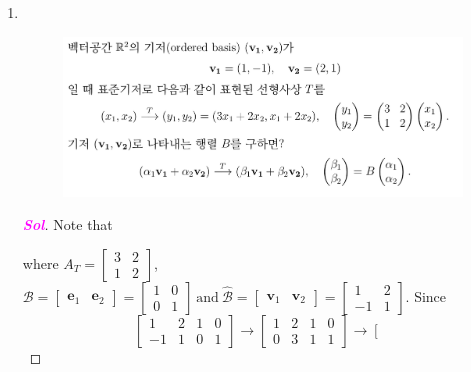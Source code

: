 \documentclass[10pt]{article}
\theoremstyle{definition}
\newcommand{\R}{\mathbb{R}}
\newcommand{\sol}{\textcolor{magenta}{\bf Sol}}
\newcommand{\basis}{\mathscr{B}}
\begin{document}
\begin{enumerate}[\bf 1.]
\newpage
\item \ \begin{figure}[h!]
	\includegraphics[scale=.35]{asgmt1_3.png}
\end{figure}
\begin{proof}[\sol]
	Note that \begin{center}
	\end{center} where $A_T=\begin{bmatrix}
	3&2\\1&2
\end{bmatrix}$, $
	\basis=\begin{bmatrix}
		\textbf{e}_1&\textbf{e}_2
	\end{bmatrix}=\begin{bmatrix}
	1&0\\0&1
\end{bmatrix}\ \text{and}\ \hat{\basis}=\begin{bmatrix}
	\textbf{v}_1&\textbf{v}_2
	\end{bmatrix}=\begin{bmatrix}
	1&2\\-1&1
	\end{bmatrix}.$ Since \[
	\left[\begin{array}{cc|cc}
		1&2 &1&0\\-1&1 &0&1
	\end{array}\right]\rightarrow\left[\begin{array}{cc|cc}
	1&2 &1&0\\0&3 &1&1
\end{array}\right]\rightarrow\left[\begin{array}{cc|cc}

\end{array}\]
\end{proof}
\end{enumerate}
\end{document}
